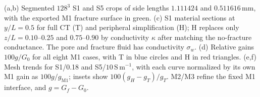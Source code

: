 (a,b) Segmented $128^3$ S1 and S5 crops of side lengths $1.111424$ and $0.511616\,\mathrm{mm}$, with the exported M1 fracture surface in green. (c) S1 material sections at $y/L=0.5$ for full CT (T) and peripheral simplification (H); H replaces only $z/L=0.10$--$0.25$ and $0.75$--$0.90$ by conductivity $\kappa$ after matching the no-fracture conductance. The pore and fracture fluid has conductivity $\sigma_w$. (d) Relative gains $100g/G_0$ for all eight M1 cases, with T in blue circles and H in red triangles. (e,f) Mesh trends for S1/0.18 and S5/$10\,\mathrm{S\,m^{-1}}$, with each curve normalized by its own M1 gain as $100g/g_{\mathrm{M1}}$; insets show $100(g_H-g_T)/g_T$. M2/M3 refine the fixed M1 interface, and $g=G_f-G_0$.
